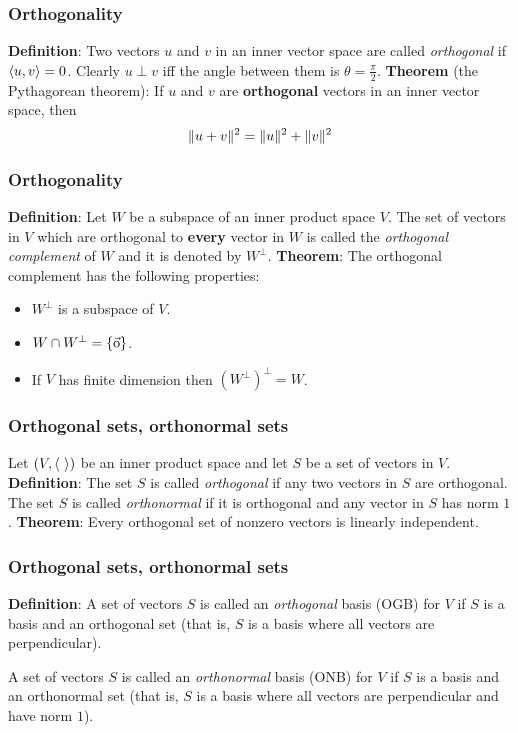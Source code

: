  \begin{frame}[fragile] \frametitle{Orthogonality}
\textbf{Definition}:  Two vectors  $u$ and $v$ in an inner vector space are called {\em orthogonal} if $\left< u, v \right> = 0$.
\smallskip
Clearly $u \perp v$ iff the angle between them is $\theta = \frac{\pi}{2}$.
\textbf{Theorem} (the Pythagorean theorem):  If $u$ and $v$ are \textbf{orthogonal} vectors in an inner vector space, then
$$\lVert u + v\rVert^2 = \lVert u\rVert^2 + \lVert v\rVert^2$$
\end{frame}

\begin{frame}[fragile]\frametitle{Orthogonality}
\textbf{Definition}:  Let $W$ be a subspace of an inner product space $V$. 
The set of vectors in $V$ which are orthogonal to \textbf{every} vector in $W$ is called the {\em orthogonal complement} of $W$ and it is denoted by $W^\perp$.
\textbf{Theorem}: The orthogonal complement has the following properties:
\begin{itemize}
\item $W^\perp$ is a subspace of $V$.
\item $W \cap W^\perp = \{ \vec{\rm{o}} \}$.
\item If $V$ has finite dimension then $(W^\perp)^\perp = W$.
\end{itemize}
\end{frame}

 \begin{frame}[fragile]\frametitle{Orthogonal sets, orthonormal sets}
Let $(V, \left<  \  \right>)$ be an inner product space and let $S$ be a set of vectors in $V$.
\textbf{Definition}: The set $S$  is called {\em orthogonal} if any two vectors in $S$  are orthogonal.
The set $S$ is called {\em orthonormal} if it is orthogonal and any vector in $S$ has norm $1$.
\textbf{Theorem}: Every orthogonal set of nonzero vectors is linearly independent.

\end{frame}

 \begin{frame}[fragile]
\frametitle{Orthogonal sets, orthonormal sets}
\textbf{Definition}: A set of vectors $S$  is called an {\em orthogonal} basis (OGB) for $V$ if $S$ is a basis and an orthogonal set (that is, $S$ is a basis where all vectors are perpendicular).

A set of vectors $S$  is called an {\em orthonormal} basis (ONB) for $V$ if $S$ is a basis and an orthonormal set (that is, $S$ is a basis where all vectors are perpendicular and have norm $1$).
\end{frame}


